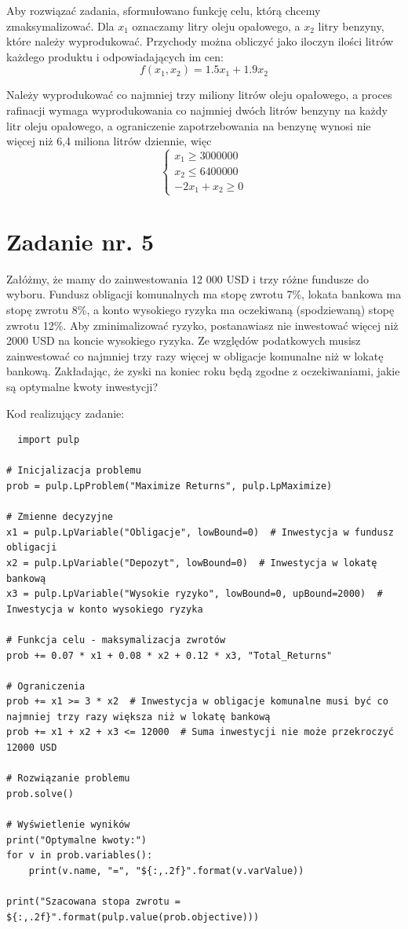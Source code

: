 \documentclass{article}
\begin{document}
Aby rozwiązać zadania, sformułowano funkcję celu, którą chcemy zmaksymalizować. Dla $x_1$ oznaczamy litry oleju opałowego, 
a $x_2$ litry benzyny, które należy wyprodukować. Przychody można obliczyć jako iloczyn ilości litrów każdego produktu i odpowiadających im cen:
\begin{equation}
   f(x_1,x_2)=1.5x_1 + 1.9x_2 
\end{equation}

Należy wyprodukować co najmniej trzy miliony litrów oleju opałowego, a proces rafinacji wymaga wyprodukowania co najmniej dwóch litrów
benzyny na każdy litr oleju opałowego, a ograniczenie zapotrzebowania na benzynę wynosi nie więcej niż 6,4 miliona litrów dziennie, więc
\begin{equation}
    \begin{cases}
        x_1 \geq 3000000\\
        x_2 \leq 6 400 000\\
        -2x_1 + x_2 \geq 0
    \end{cases}
\end{equation}
\section{Zadanie nr. 5}
Załóżmy, że mamy do zainwestowania 12 000 USD i trzy różne fundusze do 
wyboru. Fundusz obligacji komunalnych ma stopę zwrotu 7\%, lokata bankowa ma stopę zwrotu 
8\%, a konto wysokiego ryzyka ma oczekiwaną (spodziewaną) stopę zwrotu 12\%. Aby 
zminimalizować ryzyko, postanawiasz nie inwestować więcej niż 2000 USD na koncie 
wysokiego ryzyka. Ze względów podatkowych musisz zainwestować co najmniej trzy razy 
więcej w obligacje komunalne niż w lokatę bankową. Zakładając, że zyski na koniec roku będą 
zgodne z oczekiwaniami, jakie są optymalne kwoty inwestycji?

Kod realizujący zadanie:
\begin{lstlisting}
  import pulp

# Inicjalizacja problemu
prob = pulp.LpProblem("Maximize Returns", pulp.LpMaximize)

# Zmienne decyzyjne
x1 = pulp.LpVariable("Obligacje", lowBound=0)  # Inwestycja w fundusz obligacji
x2 = pulp.LpVariable("Depozyt", lowBound=0)  # Inwestycja w lokatę bankową
x3 = pulp.LpVariable("Wysokie ryzyko", lowBound=0, upBound=2000)  # Inwestycja w konto wysokiego ryzyka

# Funkcja celu - maksymalizacja zwrotów
prob += 0.07 * x1 + 0.08 * x2 + 0.12 * x3, "Total_Returns"

# Ograniczenia
prob += x1 >= 3 * x2  # Inwestycja w obligacje komunalne musi być co najmniej trzy razy większa niż w lokatę bankową
prob += x1 + x2 + x3 <= 12000  # Suma inwestycji nie może przekroczyć 12000 USD

# Rozwiązanie problemu
prob.solve()

# Wyświetlenie wyników
print("Optymalne kwoty:")
for v in prob.variables():
    print(v.name, "=", "${:,.2f}".format(v.varValue))

print("Szacowana stopa zwrotu = ${:,.2f}".format(pulp.value(prob.objective)))
\end{lstlisting}
\end{document}
